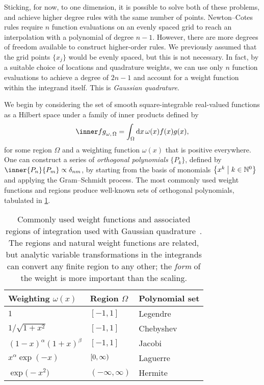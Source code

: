 Sticking, for now, to one dimension, it is possible to solve both of these problems, and achieve higher degree rules with the same number of points.
Newton--Cotes rules require $n$ function evaluations on an evenly spaced grid to reach an interpolation with a polynomial of degree $n - 1$.
However, there are more degrees of freedom available to construct higher-order rules.
We previously assumed that the grid points $\{x_j\}$ would be evenly spaced, but this is not necessary.
In fact, by a suitable choice of locations and quadrature weights, we can use only $n$ function evaluations to achieve a degree of $2n -1$ and account for a weight function within the integrand itself.
This is \emph{Gaussian quadrature}.

We begin by considering the set of smooth square-integrable real-valued functions as a Hilbert space under a family of inner products defined by
\begin{equation}
{\inner fg}_{\omega,\,\Omega} = \int_\Omega \mathrm dx\,\omega(x) f(x) g(x),
\end{equation}
for some region $\Omega$ and a weighting function $\omega(x)$ that is positive everywhere.
One can construct a series of \emph{orthogonal polynomials} $\{P_k\}$, defined by $\inner{P_n}{P_m}\propto\delta_{nm}$, by starting from the basis of monomials $\bigl\{x^k \bigm\vert k\in \mathbb N^0\bigr\}$ and applying the Gram--Schmidt process.
The most commonly used weight functions and regions produce well-known sets of orthogonal polynomials, tabulated in \cref{tab:qubiterror-gaussian-quadrature}.

\begin{table}%
    \begin{tabular*}{\figwidth}{@{\extracolsep{\fill}}lll@{}}\toprule
        Weighting $\omega(x)$ & Region $\Omega$   & Polynomial set\\\midrule
        $1$                   & $[-1, 1]$ & Legendre\\
        $1/\sqrt{1+x^2}$      & $[-1, 1]$ & Chebyshev\\
        ${(1-x)}^\alpha{(1+x)}^\beta$ & $[-1, 1]$ & Jacobi\\
        $x^\alpha \exp(-x)$     & $[0, \infty)\vphantom]$ & Laguerre\\
        $\exp\bigl(-x^2\bigr)$          & $(-\infty, \infty)$ & Hermite\\
    \bottomrule\end{tabular*}%
    \caption[Weight functions and associated orthogonal polynomials]{\label{tab:qubiterror-gaussian-quadrature}%
        Commonly used weight functions and associated regions of integration used with Gaussian quadrature~\cite{Press2007}.
        The regions and natural weight functions are related, but analytic variable transformations in the integrands can convert any finite region to any other; the \emph{form} of the weight is more important than the scaling.%
    }%
\end{table}

